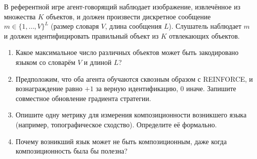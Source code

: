\begin{exercise}
\label{ex:emergent-language}
В референтной игре агент-говорящий наблюдает изображение, извлечённое из
множества $K$ объектов, и должен произвести дискретное сообщение
$m \in \{1, \ldots, V\}^L$ (размер словаря $V$, длина сообщения $L$).
Слушатель наблюдает $m$ и должен идентифицировать правильный объект из $K$
отвлекающих объектов.
\begin{enumerate}[label=(\alph*)]
  \item Какое максимальное число различных объектов может быть
    закодировано языком со словарём $V$ и длиной $L$?
  \item Предположим, что оба агента обучаются сквозным образом с REINFORCE,
    и вознаграждение равно $+1$ за верную идентификацию, $0$ иначе.
    Запишите совместное обновление градиента стратегии.
  \item Опишите одну метрику для измерения композиционности
    возникшего языка (например, топографическое сходство). Определите её
    формально.
  \item Почему возникший язык может не быть композиционным,
    даже когда композиционность была бы полезна?
\end{enumerate}
\end{exercise}
